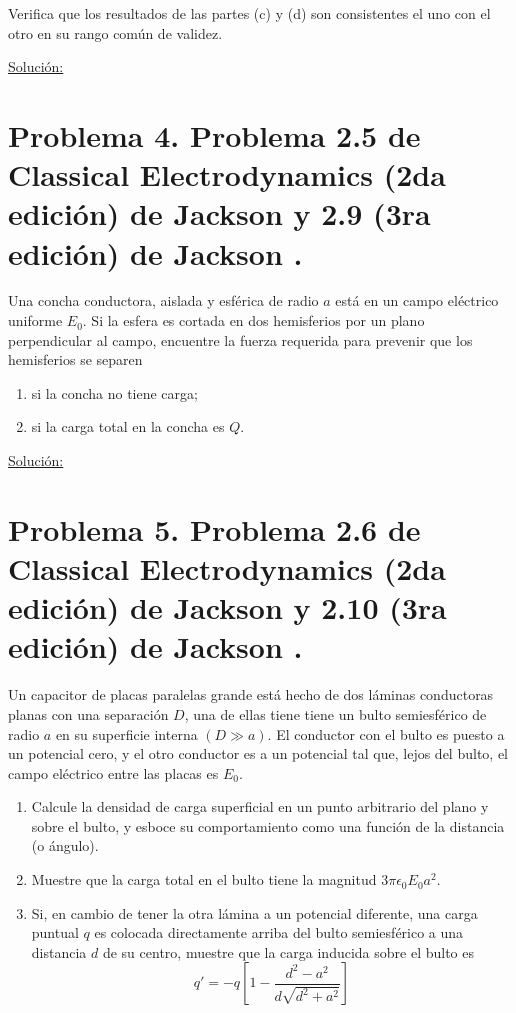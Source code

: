 \documentclass[a4paper,10pt]{article}
\numberwithin{equation}{section}
\begin{document}
Verifica que los resultados de las partes (c) y (d) son consistentes el uno 
con el otro en su rango común de validez.

\vspace{.3cm}

\underline{Solución:} \vspace{.3cm}

\section{Problema 4. Problema 2.5 de Classical Electrodynamics (2da edición) de Jackson 
\cite{jackson2} y 2.9 (3ra edición) de Jackson \cite{jackson3}.}

Una concha conductora, aislada y esférica de radio $a$ está en un campo eléctrico 
uniforme $E_0$. Si la esfera es cortada en dos hemisferios por un plano perpendicular 
al campo, encuentre la fuerza requerida para prevenir que los hemisferios se 
separen 

\begin{enumerate}[label=\textbf{(\alph*)}]
 \item si la concha no tiene carga;
 \item si la carga total en la concha es $Q$.
\end{enumerate}

\vspace{.3cm}

\underline{Solución:} \vspace{.3cm}

\section{Problema 5. Problema 2.6 de Classical Electrodynamics (2da edición) de Jackson 
\cite{jackson2} y 2.10 (3ra edición) de Jackson \cite{jackson3}.}

Un capacitor de placas paralelas grande está hecho de dos láminas conductoras 
planas con una separación $D$, una de ellas tiene tiene un bulto semiesférico 
de radio $a$ en su superficie interna $(D \gg a)$. El conductor con el bulto 
es puesto a un potencial cero, y el otro conductor es a un potencial tal que, 
lejos del bulto, el campo eléctrico entre las placas es $E_0$.

\begin{enumerate}[label=\textbf{(\alph*)}]
 \item Calcule la densidad de carga superficial en un punto arbitrario del 
 plano y sobre el bulto, y esboce su comportamiento como una función de la distancia 
 (o ángulo).
 \item Muestre que la carga total en el bulto tiene la magnitud $3\pi\epsilon_0E_0a^2$.
 \item Si, en cambio de tener la otra lámina a un potencial diferente, una carga 
 puntual $q$ es colocada directamente arriba del bulto semiesférico a una distancia 
 $d$ de su centro, muestre que la carga inducida sobre el bulto es 
 $$
 q' = -q\left[1 - \frac{d^2 - a^2}{d\sqrt{d^2 + a^2}} \right]
 $$
\end{enumerate}
\end{document}
